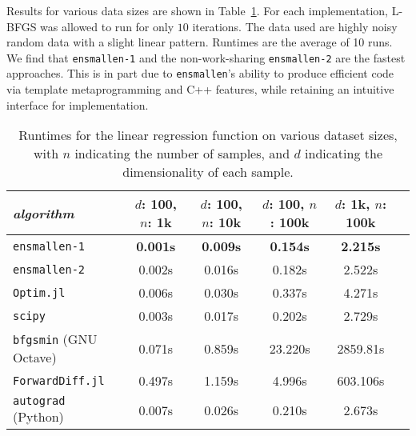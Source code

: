 \documentclass[twoside,11pt]{article}
\begin{document}
Results for various data sizes are shown in Table~\ref{tab:lbfgs}.  For each
implementation, L-BFGS was allowed to run for only $10$ iterations.  The
data used are highly noisy random
data with a slight linear pattern. %
Runtimes are the
average of 10 runs.
We find that \texttt{ensmallen-1} and the non-work-sharing {\tt ensmallen-2}
are the fastest approaches.
This is in part due to {\tt ensmallen}'s ability to produce efficient code via
template metaprogramming and C++ features, while retaining an intuitive
interface for implementation.

\begin{table}[t!]
{\small
\centering
\begin{tabular}{lccccc}
\toprule
{\em algorithm} & $d$: 100, $n$: 1k & $d$: 100, $n$: 10k & $d$: 100, $n$:
100k & $d$: 1k, $n$: 100k \\
\midrule
\texttt{ensmallen-1} & {\bf 0.001s} & {\bf 0.009s} & {\bf 0.154s} & {\bf 2.215s} \\
\texttt{ensmallen-2} & 0.002s & 0.016s & 0.182s & 2.522s \\
\texttt{Optim.jl} & 0.006s & 0.030s & 0.337s & 4.271s \\
\texttt{scipy} & 0.003s & 0.017s & 0.202s & 2.729s \\
\texttt{bfgsmin} (GNU Octave) & 0.071s & 0.859s & 23.220s & 2859.81s\\
\texttt{ForwardDiff.jl} & 0.497s & 1.159s & 4.996s & 603.106s \\
\texttt{autograd} (Python) & 0.007s & 0.026s & 0.210s & 2.673s \\
\bottomrule
\end{tabular}
\vspace*{-0.4em}
\caption{
Runtimes for the linear regression function on various dataset sizes,
with $n$ indicating the number of samples,
and $d$ indicating the dimensionality of each sample.
}
\label{tab:lbfgs}
}
\vspace*{-2.2em}
\end{table}
\end{document}
